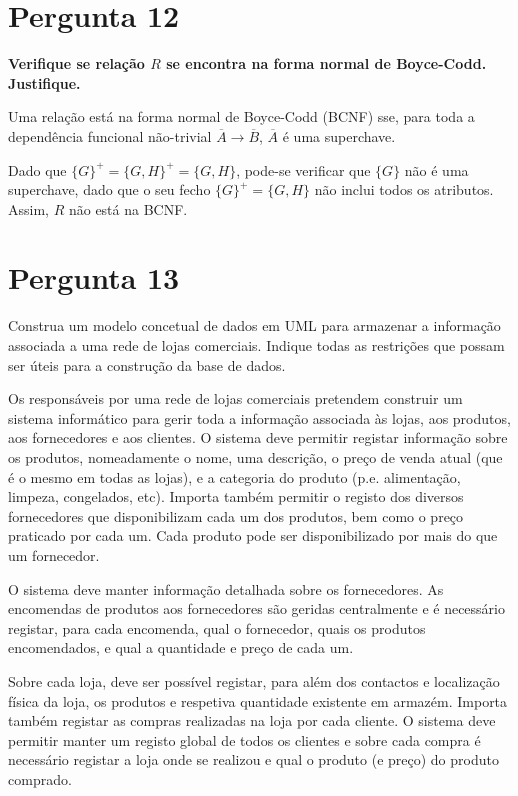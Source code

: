 \section{Pergunta 12}
\textbf{Verifique se relação $R$ se encontra na forma normal de Boyce-Codd. Justifique.}

\ansseparator

Uma relação está na forma normal de Boyce-Codd (BCNF) sse, para toda a dependência funcional não-trivial $\overline{A} \rightarrow \overline{B}$, $\overline{A}$ é uma superchave.

Dado que $\{G\}^+=\{G,H\}^+=\{G,H\}$, pode-se verificar que $\{G\}$ não é uma superchave, dado que o seu fecho $\{G\}^+=\{G,H\}$ não inclui todos os atributos. Assim, $R$ não está na BCNF.

\section{Pergunta 13}
Construa um modelo concetual de dados em UML para armazenar a informação associada a uma rede de lojas comerciais. Indique todas as restrições que possam ser úteis para a construção da base de dados.

Os responsáveis por uma rede de lojas comerciais pretendem construir um sistema informático para gerir toda a informação associada às lojas, aos produtos, aos fornecedores e aos clientes. O sistema deve permitir registar informação sobre os produtos, nomeadamente o nome, uma descrição, o preço de venda atual (que é o mesmo em todas as lojas), e a categoria do produto (p.e. alimentação, limpeza, congelados, etc). Importa também permitir o registo dos diversos fornecedores que disponibilizam cada um dos produtos, bem como o preço praticado por cada um. Cada produto pode ser disponibilizado por mais do que um fornecedor.

O sistema deve manter informação detalhada sobre os fornecedores. As encomendas de produtos aos fornecedores são geridas centralmente e é necessário registar, para cada encomenda, qual o fornecedor, quais os produtos encomendados, e qual a quantidade e preço de cada um.

Sobre cada loja, deve ser possível registar, para além dos contactos e localização física da loja, os produtos e respetiva quantidade existente em armazém. Importa também registar as compras realizadas na loja por cada cliente. O sistema deve permitir manter um registo global de todos os clientes e sobre cada compra é necessário registar a loja onde se realizou e qual o produto (e preço) do produto comprado.

